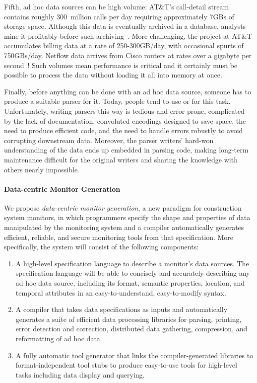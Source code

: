 \documentclass[10pt]{article}
\begin{document}
Fifth, ad hoc data sources can be high volume:
AT\&T's call-detail stream contains roughly 300~million calls per day
requiring approximately 7GBs of storage space. Although this data is
eventually archived in a database, analysts mine it profitably before
such archiving~\cite{kdd98,kdd99}. More challenging, the \ningaui{}
project at AT\&T accumulates billing data at a rate of 250-300GB/day,
with occasional spurts of 750GBs/day. Netflow data arrives from Cisco
routers at rates over a gigabyte per second~\cite{gigascope}! Such
volumes mean performance is critical and it certainly
must be possible to process the data without loading
it all into memory at once.

Finally, before anything can be done with an ad hoc data source,
someone has to produce a suitable parser for it.  Today, people tend
to use \C{} or \perl{} for this task.  Unfortunately, writing parsers
this way is tedious and error-prone, complicated by the lack of
documentation, convoluted encodings designed to save space, the need
to produce efficient code, and the need to handle errors robustly to
avoid corrupting downstream data.  Moreover, the parser writers'
hard-won understanding of the data ends up embedded in parsing code,
making long-term maintenance difficult for the original writers and
sharing the knowledge with others nearly impossible.

\paragraph*{Data-centric Monitor Generation}
We propose {\em data-centric monitor generation}, a new paradigm
for construction system monitors, in which programmers
specify the shape and properties of data manipulated by
the monitoring system and a compiler automatically
generates efficient, reliable, and secure
monitoring tools from that specification.
More specifically, the system will consist of the 
following components:

\begin{enumerate}

\item A high-level specification language to describe a monitor's
data sources.  The specification language will be able to
concisely and accurately describing any ad hoc data source,
including its format, semantic properties, location, and
temporal attributes in an easy-to-understand, easy-to-modify syntax.

\item A compiler that takes data specifications as inputs and
automatically generates a suite of 
efficient data processing libraries for parsing, printing, error detection
and correction, distributed data gathering, compression, and 
reformatting of ad hoc data.

\item A fully automatic tool generator that links the compiler-generated 
libraries to format-independent tool stubs to produce easy-to-use 
tools for high-level tasks including data display and querying.

\end{enumerate}
\end{document}
